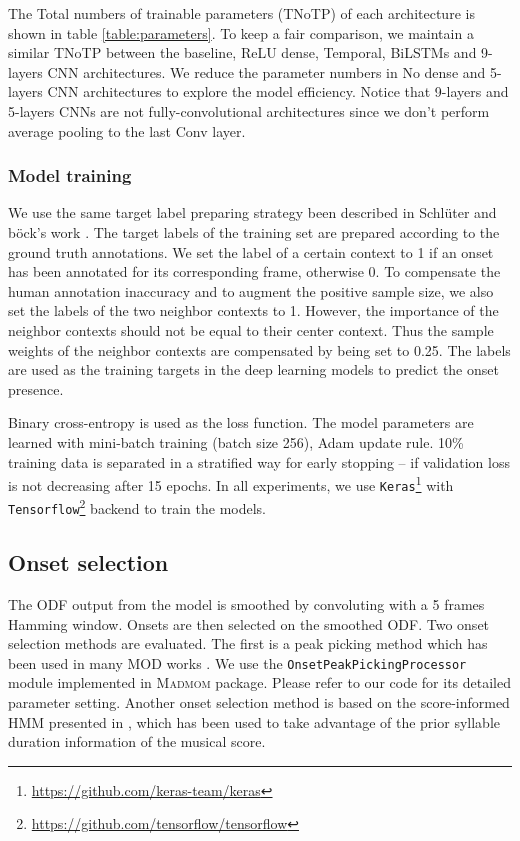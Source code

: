 The Total numbers of trainable parameters (TNoTP) of each architecture is shown in table \ref{table:parameters}. To keep a fair comparison, we maintain a similar TNoTP between the baseline, \gls{ReLU} dense, Temporal, \gls{BiLSTM}s and 9-layers \gls{CNN} architectures. We reduce the parameter numbers in No dense and 5-layers \gls{CNN} architectures to explore the model efficiency. Notice that 9-layers and 5-layers \gls{CNN}s are not fully-convolutional architectures \cite{Long2015} since we don't perform average pooling to the last \gls{Conv} layer.

\subsubsection{Model training}\label{sec:ch5:model_training_improving}

We use the same target label preparing strategy been described in Schl\"{u}ter and b\"{o}ck's work \cite{Schluter2014}. The target labels of the training set are prepared according to the ground truth annotations. We set the label of a certain context to 1 if an onset has been annotated for its corresponding frame, otherwise 0. To compensate the human annotation inaccuracy and to augment the positive sample size, we also set the labels of the two neighbor contexts to 1. However, the importance of the neighbor contexts should not be equal to their center context. Thus the sample weights of the neighbor contexts are compensated by being set to 0.25. The labels are used as the training targets in the deep learning models to predict the onset presence.

Binary cross-entropy is used as the loss function. The model parameters are learned with mini-batch training (batch size 256), Adam \cite{kingma2014adam} update rule. 10\% training data is separated in a stratified way for early stopping -- if validation loss is not decreasing after 15 epochs. In all experiments, we use \texttt{Keras}\footnote{\url{https://github.com/keras-team/keras}} with \texttt{Tensorflow}\footnote{\url{https://github.com/tensorflow/tensorflow}} backend to train the models.

\subsection{Onset selection}\label{sec:ch5:onset_selection_improving}
The \gls{ODF} output from the model is smoothed by convoluting with a 5 frames Hamming window. Onsets are then selected on the smoothed \gls{ODF}. Two onset selection methods are evaluated.  The first is a peak picking method which has been used in many \gls{MOD} works \cite{Bock2012c, Schluter2014,Vogl2017DrumTV}. We use the \texttt{OnsetPeakPickingProcessor} module implemented in \textsc{Madmom} \cite{Bock2016} package. Please refer to our code for its detailed parameter setting. Another onset selection method is based on the score-informed \gls{HMM} presented in , which has been used to take advantage of the prior syllable duration information of the musical score.

